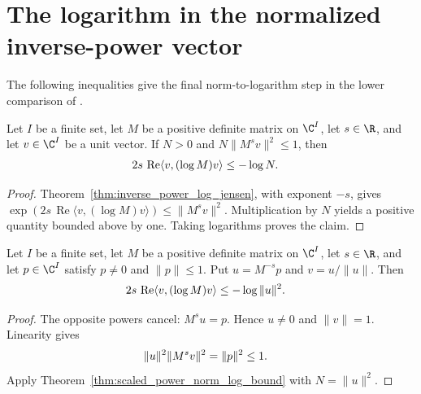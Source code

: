 \section{The logarithm in the normalized inverse-power vector}
\label{sec:normalized_inverse_power_log_bound}

The following inequalities give the final norm-to-logarithm step in the
lower comparison of
\cite[lines~642--651 of the norm-comparison argument]{OpenAI2026AreaLaw}.

\begin{theorem}
\label{thm:scaled_power_norm_log_bound}
\leanok
Let $I$ be a finite set, let $M$ be a positive definite matrix on $\C^I$,
let $s\in\R$, and let $v\in\C^I$ be a unit vector.
If $N>0$ and $N\|M^s v\|^2\le1$, then
\begin{align}
 2s\,\operatorname{Re}\langle v,(\log M)v\rangle
 &\le-\log N. \notag
\end{align}
\end{theorem}
\begin{proof}\leanok
{}
Theorem~\ref{thm:inverse_power_log_jensen}, with exponent $-s$, gives
$\exp(2s\,\operatorname{Re}\langle v,(\log M)v\rangle)\le\|M^s v\|^2$.
Multiplication by $N$ yields a positive quantity bounded above by one.
Taking logarithms proves the claim.
\end{proof}

\begin{theorem}
\label{thm:normalized_inverse_power_log_bound}
\leanok
Let $I$ be a finite set, let $M$ be a positive definite matrix on $\C^I$,
let $s\in\R$, and let $p\in\C^I$ satisfy $p\ne0$ and $\|p\|\le1$.
Put $u=M^{-s}p$ and $v=u/\|u\|$. Then
\begin{align}
 2s\,\operatorname{Re}\langle v,(\log M)v\rangle
 &\le-\log\|u\|^2. \notag
\end{align}
\end{theorem}
\begin{proof}\leanok
{}
The opposite powers cancel: $M^su=p$. Hence $u\ne0$ and $\|v\|=1$.
Linearity gives
\begin{align}
 \|u\|^2\|M^sv\|^2&=\|p\|^2\le1. \notag
\end{align}
Apply Theorem~\ref{thm:scaled_power_norm_log_bound} with $N=\|u\|^2$.
\end{proof}
